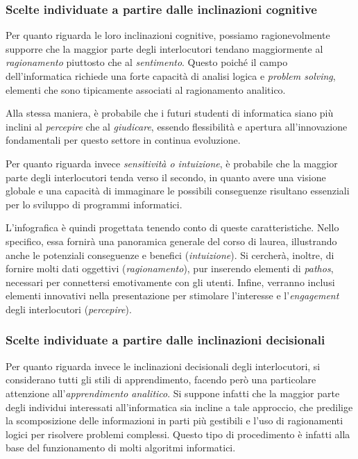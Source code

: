 \subsubsection{Scelte individuate a partire dalle inclinazioni cognitive}
Per quanto riguarda le loro inclinazioni cognitive, possiamo ragionevolmente supporre che la maggior parte degli interlocutori tendano maggiormente al \emph{ragionamento} piuttosto che al \emph{sentimento}. 
Questo poiché il campo dell'informatica richiede una forte capacità di analisi logica e \emph{problem solving}, elementi che sono tipicamente associati al ragionamento analitico. 

Alla stessa maniera, è probabile che i futuri studenti di informatica siano più inclini al \emph{percepire} che al \emph{giudicare}, essendo flessibilità e apertura all'innovazione fondamentali per questo settore 
in continua evoluzione. 

Per quanto riguarda invece \emph{sensitività o intuizione}, è probabile che la maggior parte degli interlocutori tenda verso il secondo, in quanto avere una visione globale e una capacità di immaginare le possibili conseguenze 
risultano essenziali per lo sviluppo di programmi informatici.

\bigskip
\noindent L'infografica è quindi progettata tenendo conto di queste caratteristiche. Nello specifico, essa fornirà una panoramica generale del corso di laurea, illustrando anche le potenziali conseguenze e benefici (\emph{intuizione}). Si cercherà, inoltre, 
di fornire molti dati oggettivi (\emph{ragionamento}), pur inserendo elementi di \emph{pathos}, necessari per connettersi emotivamente con gli utenti. Infine, verranno inclusi elementi innovativi nella presentazione per stimolare l'interesse e 
l'\emph{engagement} degli interlocutori (\emph{percepire}).

\subsubsection{Scelte individuate a partire dalle inclinazioni decisionali}
Per quanto riguarda invece le inclinazioni decisionali degli interlocutori, si considerano tutti gli stili di apprendimento, facendo però una particolare attenzione all'\emph{apprendimento analitico}. Si suppone infatti che la 
maggior parte degli individui interessati all'informatica sia incline a tale approccio, che predilige la scomposizione delle informazioni in parti più gestibili e l'uso di ragionamenti logici per risolvere problemi complessi. Questo tipo di
procedimento è infatti alla base del funzionamento di molti algoritmi informatici.

